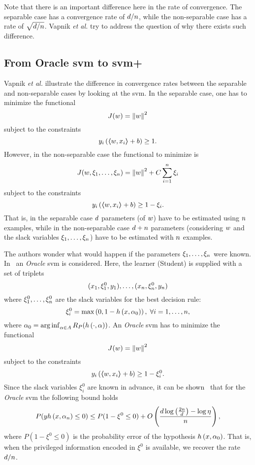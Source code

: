 Note that there is an important difference here in the rate of convergence. The separable case has a convergence rate of $d/n$, while the non-separable case has a rate of $\sqrt{d/n}$. Vapnik \emph{et al.} try to address the question of why there exists such difference.

\subsection{From Oracle \acrshort{svm} to \acrshort{svm}+}
Vapnik \emph{et al.} illustrate the difference in convergence rates between the separable and non-separable cases by looking at the \acrshort{svm}. In the separable case, one has to minimize the functional 
$$J(w) = \left\lVert w\right\rVert^2$$
subject to the constraints
$$y_i \left( \bm{\left\langle} w, x_i \bm{\right\rangle} + b \right) \geq 1.$$
However, in the non-separable case the functional to minimize is 
$$J(w, \xi_1, \ldots, \xi_n) = \left\lVert w\right\rVert^2 + C \sum_{i=1}^n \xi_i$$
subject to the constraints
$$y_i \left( \bm{\left\langle} w, x_i \bm{\right\rangle} + b \right) \geq 1 - \xi_i.$$
That is, in the separable case $d$ parameters (of $w$) have to be estimated using $n$ examples, while in the non-separable case $d + n$ parameters (considering $w$ and the slack variables $\xi_1, \ldots, \xi_n$) have to be estimated with $n$ examples. 

The authors wonder what would happen if the parameters $\xi_1, \ldots, \xi_n$ were known.
In~\cite{VapnikI15a} an \emph{Oracle} \acrshort{svm} is considered. Here, the learner (Student) is supplied with a set of triplets
\begin{equation}
    \nonumber
    (x_1, \xi_1^0, y_1), \ldots, (x_n, \xi_n^0, y_n)
\end{equation}
where $\xi^0_1, \ldots, \xi^0_n$ are the slack variables for the best decision rule:
\begin{equation}
    \nonumber
    \xi_i^0 = \max \left(0, 1 - h\left(x, \alpha_0\right)  \right), \; \forall i = 1, \ldots, n ,
\end{equation}
where $\alpha_0 = \operatorname*{arg\inf}_{\alpha \in A} R_P(h\left(\cdot, \alpha\right)) $.
An \emph{Oracle} \acrshort{svm} has to minimize the functional
$$J(w) = \left\lVert w\right\rVert^2$$
subject to the constraints
$$y_i \left( \bm{\left\langle} w, x_i \bm{\right\rangle} + b \right) \geq 1 - \xi_i^0 .$$
Since the slack variables $\xi_i^0$ are known in advance, it can be shown~\citep{VapnikV09} that for the \emph{Oracle} \acrshort{svm} the following bound holds
\begin{equation}
    \nonumber
    P(y h\left(x, \alpha_n\right) \leq 0) \leq P(1 - \xi^0 \leq 0) + O\left( \frac{d \log\left(\frac{2n}{d} \right) - \log\eta}{n}  \right) ,
\end{equation}
where $P(1 - \xi^0 \leq 0)$ is the probability error of the hypothesis $h\left(x, \alpha_0\right)$.
That is, when the privileged information encoded in $\xi^0$ is available, we recover the rate $d/n$.

